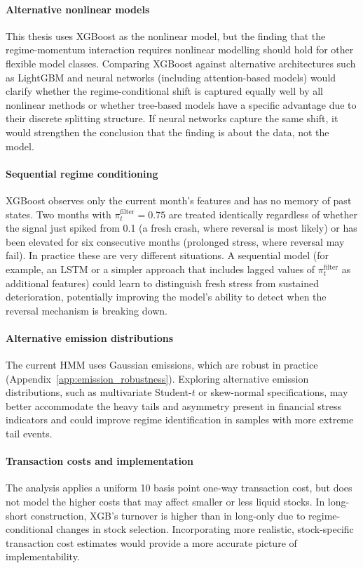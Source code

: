 \paragraph{Alternative nonlinear models}
This thesis uses XGBoost as the nonlinear model, but the finding that the regime-momentum interaction requires nonlinear modelling should hold for other flexible model classes. Comparing XGBoost against alternative architectures such as LightGBM and neural networks (including attention-based models) would clarify whether the regime-conditional shift is captured equally well by all nonlinear methods or whether tree-based models have a specific advantage due to their discrete splitting structure. If neural networks capture the same shift, it would strengthen the conclusion that the finding is about the data, not the model.

\paragraph{Sequential regime conditioning}
XGBoost observes only the current month's features and has no memory of past states. Two months with $\pi_t^{\text{filter}} = 0.75$ are treated identically regardless of whether the signal just spiked from 0.1 (a fresh crash, where reversal is most likely) or has been elevated for six consecutive months (prolonged stress, where reversal may fail). In practice these are very different situations. A sequential model (for example, an LSTM or a simpler approach that includes lagged values of $\pi_t^{\text{filter}}$ as additional features) could learn to distinguish fresh stress from sustained deterioration, potentially improving the model's ability to detect when the reversal mechanism is breaking down.

\paragraph{Alternative emission distributions}
The current HMM uses Gaussian emissions, which are robust in practice (Appendix~\ref{app:emission_robustness}). Exploring alternative emission distributions, such as multivariate Student-$t$ or skew-normal specifications, may better accommodate the heavy tails and asymmetry present in financial stress indicators and could improve regime identification in samples with more extreme tail events.

\paragraph{Transaction costs and implementation}
The analysis applies a uniform 10 basis point one-way transaction cost, but does not model the higher costs that may affect smaller or less liquid stocks. In long-short construction, XGB's turnover is higher than in long-only due to regime-conditional changes in stock selection. Incorporating more realistic, stock-specific transaction cost estimates would provide a more accurate picture of implementability.
